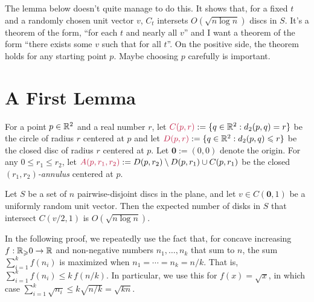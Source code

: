 \documentclass{patmorin}
\makeatletter
\renewcommand{\ge}{\geqslant}
\renewcommand{\le}{\leqslant}
\newcommand{\defin}[1]{\emph{\textcolor{brightmaroon}{#1}}}
\def\mathcolor#1#{\@mathcolor{#1}}
\def\@mathcolor#1#2#3{%
  \protect\leavevmode
  \begingroup
    \color#1{#2}#3%
  \endgroup
}
\newcommand{\mathdefin}[1]{\mathcolor{brightmaroon}{#1}}
\makeatother
\begin{document}
The lemma below doesn't quite manage to do this.  It shows that, for a fixed $t$ and a randomly chosen unit vector $v$, $C_t$ intersets $O(\sqrt{n\log n})$ discs in $S$.  It's a theorem of the form, ``for each $t$ and nearly all $v$'' and I want a theorem of the form ``there exists some $v$ such that for all $t$''.  On the positive side, the theorem holds for any starting point $p$.  Maybe choosing $p$ carefully is important.



\section{A First Lemma}

For a point $p\in\mathbb{R}^2$ and a real number $r$, let $\mathdefin{C(p,r)}:=\{q\in\R^2: d_2(p,q)=r\}$ be the circle of radius $r$ centered at $p$ and let $\mathdefin{D(p,r)}:=\{q\in\R^2: d_2(p,q)\le r\}$ be the closed disc of radius $r$ centered at $p$.  Let $\mathbf{0}:=(0,0)$ denote the origin.  For any $0\le r_1\le r_2$, let $\mathdefin{A(p,r_1,r_2)}:=D(p,r_2)\setminus D(p,r_1)\cup C(p,r_1)$ be the closed \defin{$(r_1,r_2)$-annulus} centered at $p$.

\begin{lem}
  Let $S$ be a set of $n$ pairwise-disjoint discs in the plane, and let $v\in C(\mathbf{0},1)$ be a uniformly random unit vector.  Then the expected number of disks in $S$ that intersect $C(v/2,1)$ is $O(\sqrt{n\log n})$.
\end{lem}

In the following proof, we repeatedly use the fact that, for concave increasing $f:\R_\ge 0\to\R$ and non-negative numbers $n_1,\ldots,n_k$ that sum to $n$, the sum $\sum_{i=1}^k f(n_i)$ is maximized when $n_1=\cdots=n_k=n/k$.  That is, $\sum_{i=1}^k f(n_i) \le k\,f(n/k)$.  In particular, we use this for $f(x)=\sqrt{x}$, in which case $\sum_{i=1}^k \sqrt{n_i}\le k\sqrt{n/k}=\sqrt{kn}$.
\end{document}
